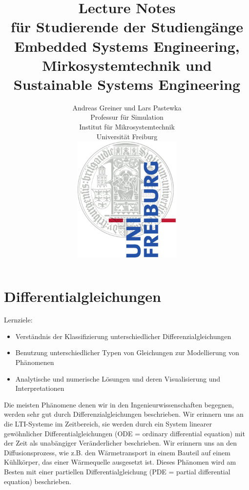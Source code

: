 \documentclass[a4paper,12pt]{book}%
\title{\huge Lecture Notes\\
\large für Studierende der Studiengänge Embedded Systems Engineering, Mirkosystemtechnik und Sustainable Systems Engineering}
\author{Andreas Greiner und Lars Pastewka \\Professur für Simulation\\Institut für Mikrosystemtechnik\\Universität Freiburg\\[1cm]
  \includegraphics[width=0.4\textwidth]{fig/Uni_Logo-Grundversion_E1_A4_RGB}
}
\begin{document}
\frontmatter
\maketitle
\part{Differentialgleichungen}
Lernziele:
\begin{itemize}
\item Verständnis der Klassifizierung unterschiedlicher Differenzialgleichungen
\item Benutzung unterschiedlicher Typen von Gleichungen zur Modellierung von Phä\-nomenen
\item Analytische und numerische Lösungen und deren Visualisierung und Interpretationen
\end{itemize}
Die meisten Phänomene denen wir in den Ingenieurwissenschaften begegnen,
werden sehr gut durch Differenzialgleichungen beschrieben. Wir erinnern uns an
die LTI-Systeme im Zeitbereich,  sie werden durch ein System linearer gewöhnlicher
Differentialgleichungen (ODE = ordinary differential equation) mit der Zeit als
unabängiger Veränderlicher beschrieben. Wir erinnern uns an den
Diffusionsprozess, wie z.B. den Wärmetransport in einem Bauteil auf einem
Kühlkörper, das einer Wärmequelle ausgesetzt ist. Dieses Phänomen wird am
Besten mit einer partiellen Differentialgleichung (PDE = partial differential
equation) beschrieben.
\end{document}
